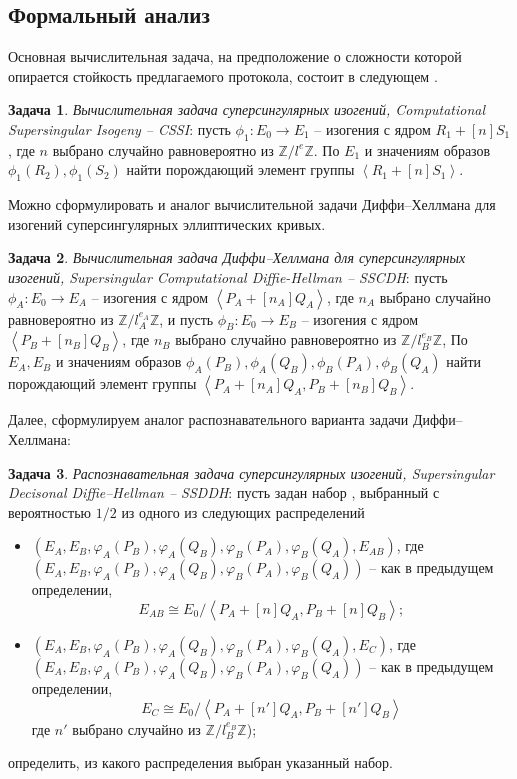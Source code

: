 \documentclass[a4paper,12pt]{article}
\newcommand{\ZZ}{\mathbb{Z}}
\newcommand{\tr}[1]{\left\langle #1\right\rangle}
\theoremstyle{definition}
\newtheorem{problem}{Задача}
\begin{document}
\subsection{Формальный анализ}

Основная вычислительная задача, на предположение о сложности которой опирается стойкость предлагаемого протокола, состоит в следующем \cite{DF}.

\begin{problem}\label{problem31} \emph{Вычислительная задача суперсингулярных изогений, Computational Supersingular Isogeny -- CSSI}: пусть $\phi_1: E_0 \to E_1$ -- изогения с ядром
$R_1 + [n]S_1$, где   $n $ выбрано случайно равновероятно из $\ZZ/l^{e}\ZZ$. По $E_1$ и значениям образов $\phi_1(R_2), \phi_1(S_2)$ найти порождающий элемент группы $\tr{R_1+[n]S_1}$.
\end{problem}

Можно сформулировать и аналог вычислительной задачи Диффи--Хеллмана для изогений суперсингулярных эллиптических кривых.

\begin{problem}\label{problem32} \emph{Вычислительная задача Диффи--Хеллмана для суперсингулярных изогений, Supersingular Computational Diffie-Hellman --  SSCDH}: 
пусть $\phi_A: E_0 \to E_A$ -- изогения с ядром $\tr{P_A+[n_A]Q_A}$, где   $n_A $ выбрано случайно равновероятно из $\ZZ/l_A^{e_A}\ZZ$,
и пусть $\phi_B: E_0 \to E_B$ -- изогения с ядром $\tr{P_B+[n_B]Q_B}$, где   $n_B $ выбрано случайно равновероятно из $\ZZ/l_B^{e_B}\ZZ$,
По $E_A,E_B$ и значениям образов $\phi_A(P_B), \phi_A(Q_B), \phi_B(P_A), \phi_B(Q_A)$ найти порождающий элемент группы $\tr{P_A+[n_A]Q_A, P_B+[n_B]Q_B}$.
\end{problem}

Далее, сформулируем аналог распознавательного варианта задачи Диффи--Хеллмана: 

 \begin{problem}\label{problem8} \emph{Распознавательная задача суперсингулярных изогений, Supersingular Decisonal Diffie--Hellman -- SSDDH}: пусть задан набор , выбранный с вероятностью $1/2$ из одного из следующих распределений
\begin{itemize}
\item $(E_A,E_B,\varphi_A(P_B), \varphi_A(Q_B), \varphi_B(P_A), \varphi_B(Q_A),E_{AB})$, где\\ $(E_A,E_B,\varphi_A(P_B), \varphi_A(Q_B), \varphi_B(P_A), \varphi_B(Q_A))$ -- как в предыдущем определении,
$$
E_{AB} \cong E_0/\tr{P_A+[n]Q_A, P_B+[n]Q_B};
$$
\item $(E_A,E_B,\varphi_A(P_B), \varphi_A(Q_B), \varphi_B(P_A), \varphi_B(Q_A),E_{C})$, где\\  $(E_A,E_B,\varphi_A(P_B), \varphi_A(Q_B), \varphi_B(P_A), \varphi_B(Q_A))$ --  как в предыдущем определении,  
$$
E_C \cong E_0/\tr{P_A+[n']Q_A, P_B+[n']Q_B}
$$
где $ n'$ выбрано случайно из $\ZZ/l_B^{e_B}\ZZ$);
\end{itemize}
определить, из какого распределения выбран указанный набор. 
\end{problem}
\end{document}
